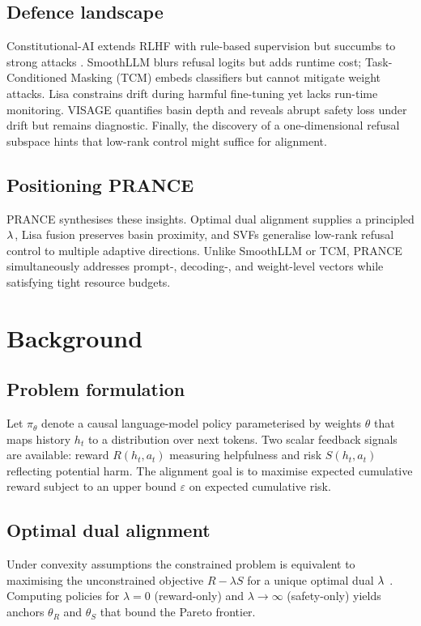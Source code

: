 \documentclass{article}
\begin{document}
\subsection{Defence landscape}
Constitutional-AI extends RLHF with rule-based supervision but succumbs to strong attacks \cite{wei-2023-jailbroken}. SmoothLLM blurs refusal logits but adds runtime cost; Task-Conditioned Masking (TCM) embeds classifiers but cannot mitigate weight attacks. Lisa constrains drift during harmful fine-tuning \cite{huang-2024-lisa} yet lacks run-time monitoring. VISAGE quantifies basin depth and reveals abrupt safety loss under drift \cite{peng-2024-navigating} but remains diagnostic. Finally, the discovery of a one-dimensional refusal subspace \cite{arditi-2024-refusal} hints that low-rank control might suffice for alignment.
\subsection{Positioning PRANCE}
PRANCE synthesises these insights. Optimal dual alignment supplies a principled $\lambda^{\*}$, Lisa fusion preserves basin proximity, and SVFs generalise low-rank refusal control to multiple adaptive directions. Unlike SmoothLLM or TCM, PRANCE simultaneously addresses prompt-, decoding-, and weight-level vectors while satisfying tight resource budgets.

\section{Background}
\subsection{Problem formulation}
Let $\pi_{\theta}$ denote a causal language-model policy parameterised by weights $\theta$ that maps history $h_t$ to a distribution over next tokens. Two scalar feedback signals are available: reward $R(h_t,a_t)$ measuring helpfulness and risk $S(h_t,a_t)$ reflecting potential harm. The alignment goal is to maximise expected cumulative reward subject to an upper bound $\varepsilon$ on expected cumulative risk.
\subsection{Optimal dual alignment}
Under convexity assumptions the constrained problem is equivalent to maximising the unconstrained objective $R - \lambda S$ for a unique optimal dual $\lambda^{\*}$ \cite{huang-2024-one}. Computing policies for $\lambda = 0$ (reward-only) and $\lambda \to \infty$ (safety-only) yields anchors $\theta_{R}$ and $\theta_{S}$ that bound the Pareto frontier.
\end{document}
